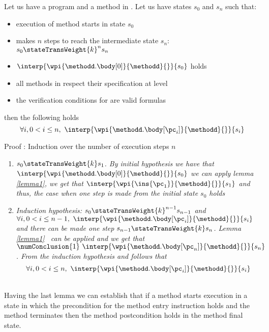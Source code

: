 \begin{lemma}\label{lemma3}
Let us have a program \Program{} and a method \methodd{} in \Program.
 Let us have states  $s_{0}$ and $s_n$ such that: 
\begin{itemize} 
     \item execution of method  \methodd{} starts  in state $s_{0}$ 
     \item  makes $n$ steps to reach the intermediate state $s_n$: $s_{0} \stateTransWeight{k}^{n} s_{n} $
     \item $\interp{ \wpi{\methodd.\body[0] } {\methodd}{}}{ s_{0}}$ holds
     \item all methods in \Program{} respect their specification at level   
     \item the verification conditions for \Program{} are valid formulas
\end{itemize}  
 then the following holds
$$\forall i,  0 < i \le n, \  \interp{ \wpi{\methodd.\body[\pc_i] } {\methodd}{ }}{ s_{i}} $$

\end{lemma}
Proof : Induction over the number of execution steps $n$
\begin{enumerate}
    \item\textit{ $s_{0} \stateTransWeight{k} s_{1}$. By initial hypothesis we have that  $\interp{ \wpi{\methodd.\body[0] } {\methodd}{}}{ s_{0}}$
             we can apply lemma \ref{lemma1}, we get that 
             $\interp{ \wpi{\ins{\pc_{1}}}{\methodd}{  } } { s_{1} }  $ and thus, the  case when one step is made from the initial state
             $s_0$  holds}   
    \item \textit{Induction hypothesis:   $s_{0} \stateTransWeight{k}^{n - 1} s_{n - 1}$ and \\
           $\forall i,  0 < i \le n - 1, \  \interp{ \wpi{\methodd.\body[\pc_i] } {\methodd}{}}{ s_{i}} $
           and there can be made one step $s_{n- 1} \stateTransWeight{k} s_n$.  Lemma \ref{lemma1} \ can be applied and we get that
           $\numConclusion{1} \ \interp{ \wpi{\methodd.\body[\pc_n] } {\methodd}{ } }{ s_{n}} $. 
	   From the induction hypothesis and  follows that 
	   $$\forall i,  0 < i \le n, \  \interp{ \wpi{\methodd.\body[\pc_i] } {\methodd}{ }}{ s_{i}} $$ }
\end{enumerate}
\Qed \\

Having the last lemma we can  establish that if a method starts
execution in a state in which the \fwpi{} precondition  for the method entry instruction 
holds and the method terminates then the method postcondition holds in the method final state.

